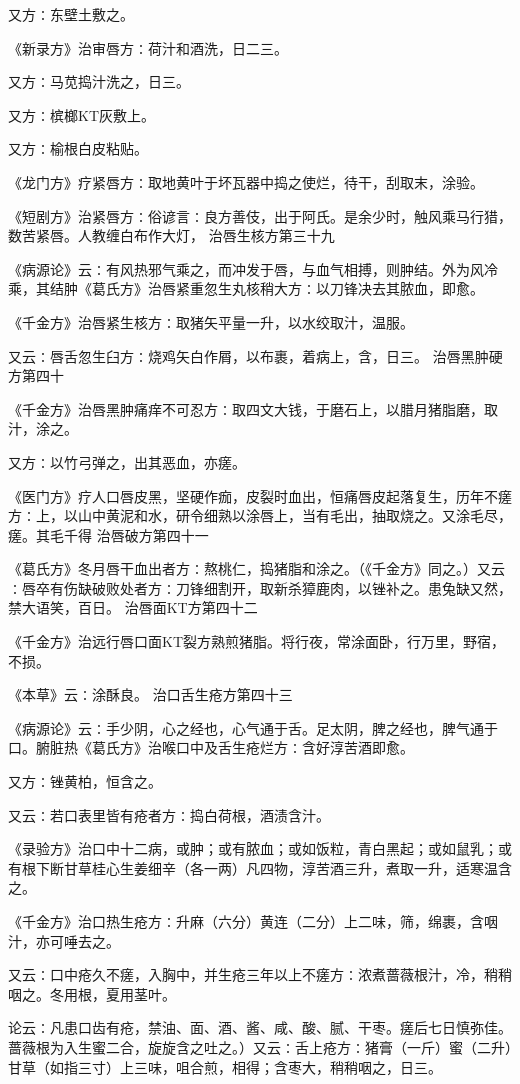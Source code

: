 \documentclass[a4paper,12pt,UTF8,twoside]{ctexbook}
\begin{document}
又方∶东壁土敷之。

《新录方》治审唇方∶荷汁和酒洗，日二三。

又方∶马苋捣汁洗之，日三。

又方∶槟榔KT灰敷上。

又方∶榆根白皮粘贴。

《龙门方》疗紧唇方∶取地黄叶于坏瓦器中捣之使烂，待干，刮取末，涂验。

《短剧方》治紧唇方∶俗谚言∶良方善伎，出于阿氏。是余少时，触风乘马行猎，数苦紧唇。人教缠白布作大灯，
治唇生核方第三十九

《病源论》云∶有风热邪气乘之，而冲发于唇，与血气相搏，则肿结。外为风冷乘，其结肿《葛氏方》治唇紧重忽生丸核稍大方∶以刀锋决去其脓血，即愈。

《千金方》治唇紧生核方∶取猪矢平量一升，以水绞取汁，温服。

又云∶唇舌忽生臼方∶烧鸡矢白作屑，以布裹，着病上，含，日三。
治唇黑肿硬方第四十

《千金方》治唇黑肿痛痒不可忍方∶取四文大钱，于磨石上，以腊月猪脂磨，取汁，涂之。

又方∶以竹弓弹之，出其恶血，亦瘥。

《医门方》疗人口唇皮黑，坚硬作痂，皮裂时血出，恒痛唇皮起落复生，历年不瘥方∶上，以山中黄泥和水，研令细熟以涂唇上，当有毛出，抽取烧之。又涂毛尽，瘥。其毛千得
治唇破方第四十一

《葛氏方》冬月唇干血出者方∶熬桃仁，捣猪脂和涂之。（《千金方》同之。）又云∶唇卒有伤缺破败处者方∶刀锋细割开，取新杀獐鹿肉，以锉补之。患兔缺又然，禁大语笑，百日。
治唇面KT方第四十二

《千金方》治远行唇口面KT裂方熟煎猪脂。将行夜，常涂面卧，行万里，野宿，不损。

《本草》云∶涂酥良。
治口舌生疮方第四十三

《病源论》云∶手少阴，心之经也，心气通于舌。足太阴，脾之经也，脾气通于口。腑脏热《葛氏方》治喉口中及舌生疮烂方∶含好淳苦酒即愈。

又方∶锉黄柏，恒含之。

又云∶若口表里皆有疮者方∶捣白荷根，酒渍含汁。

《录验方》治口中十二病，或肿；或有脓血；或如饭粒，青白黑起；或如鼠乳；或有根下断甘草桂心生姜细辛（各一两）凡四物，淳苦酒三升，煮取一升，适寒温含之。

《千金方》治口热生疮方∶升麻（六分）黄连（二分）上二味，筛，绵裹，含咽汁，亦可唾去之。

又云∶口中疮久不瘥，入胸中，并生疮三年以上不瘥方∶浓煮蔷薇根汁，冷，稍稍咽之。冬用根，夏用茎叶。

论云∶凡患口齿有疮，禁油、面、酒、酱、咸、酸、腻、干枣。瘥后七日慎弥佳。蔷薇根为入生蜜二合，旋旋含之吐之。）又云∶舌上疮方∶猪膏（一斤）蜜（二升）甘草（如指三寸）上三味，咀合煎，相得；含枣大，稍稍咽之，日三。
\end{document}
